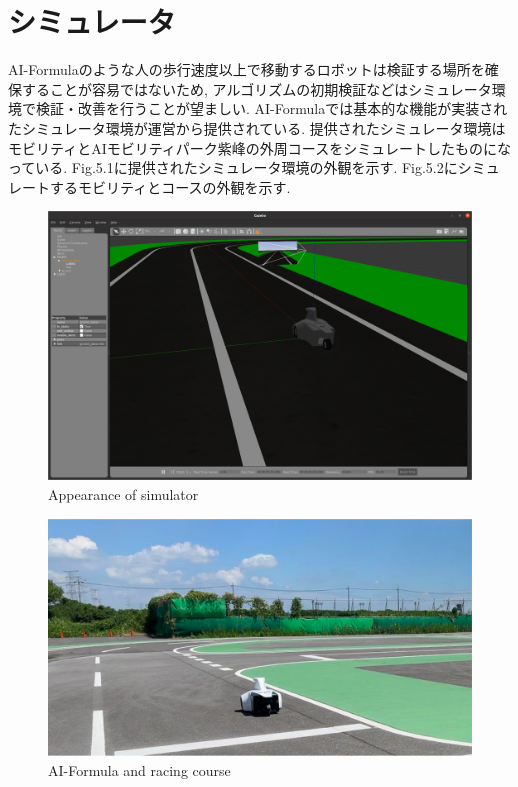 
\section{シミュレータ}
AI-Formulaのような人の歩行速度以上で移動するロボットは検証する場所を確保することが容易ではないため, アルゴリズムの初期検証などはシミュレータ環境で検証・改善を行うことが望ましい.
AI-Formulaでは基本的な機能が実装されたシミュレータ環境が運営から提供されている.
提供されたシミュレータ環境はモビリティとAIモビリティパーク紫峰の外周コースをシミュレートしたものになっている.
Fig.5.1に提供されたシミュレータ環境の外観を示す.
Fig.5.2にシミュレートするモビリティとコースの外観を示す.

\begin{figure}[H]
  \centering
 \includegraphics[keepaspectratio, scale=0.2]
      {images/simulator.png}
 \caption{Appearance of simulator}
 \label{fig:simulator}
\end{figure}

\begin{figure}[H]
  \centering
 \includegraphics[keepaspectratio, scale=0.2]
      {images/realworld.png}
 \caption{AI-Formula and racing course}
 \label{fig:simulator}
\end{figure}


